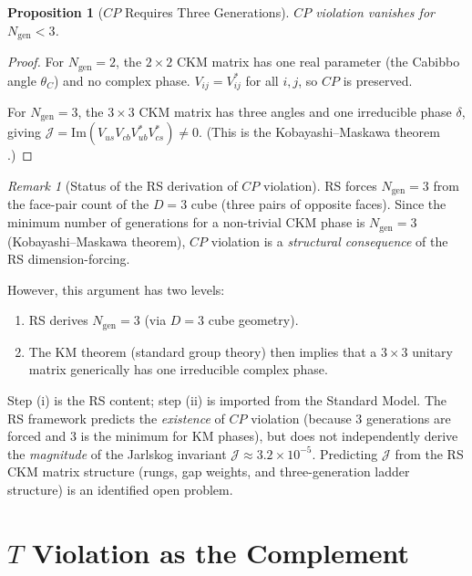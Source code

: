 \documentclass[12pt,a4paper]{article}
\newtheorem{proposition}[theorem]{Proposition}
\theoremstyle{definition}
\theoremstyle{remark}
\newtheorem{remark}[theorem]{Remark}
\begin{document}
\begin{proposition}[$CP$ Requires Three Generations]
\label{prop:three-gen}
$CP$ violation vanishes for $N_{\mathrm{gen}} < 3$.
\end{proposition}

\begin{proof}
For $N_{\mathrm{gen}} = 2$, the $2 \times 2$ CKM matrix has one
real parameter (the Cabibbo angle $\theta_C$) and no complex
phase.  $V_{ij} = V_{ij}^*$ for all $i, j$, so $CP$ is
preserved.

For $N_{\mathrm{gen}} = 3$, the $3 \times 3$ CKM matrix has
three angles and one irreducible phase $\delta$, giving
$\mathcal{J} = \mathrm{Im}(V_{us} V_{cb} V_{ub}^* V_{cs}^*)
\neq 0$.  (This is the Kobayashi--Maskawa theorem \cite{KM1973}.)
\end{proof}

\begin{remark}[Status of the RS derivation of $CP$ violation]
\label{rem:cp-status}
RS forces $N_{\mathrm{gen}} = 3$ from the face-pair count of the
$D = 3$ cube (three pairs of opposite faces).  Since the minimum
number of generations for a non-trivial CKM phase is $N_{\mathrm{gen}}
= 3$ (Kobayashi--Maskawa theorem), $CP$ violation is a \emph{structural
consequence} of the RS dimension-forcing.

However, this argument has two levels:
\begin{enumerate}[label=(\roman*)]
  \item RS derives $N_{\mathrm{gen}} = 3$ (via $D = 3$ cube geometry).
  \item The KM theorem (standard group theory) then implies that a
  $3 \times 3$ unitary matrix generically has one irreducible complex
  phase.
\end{enumerate}
Step (i) is the RS content; step (ii) is imported from the Standard Model.
The RS framework predicts the \emph{existence} of $CP$ violation (because
3 generations are forced and 3 is the minimum for KM phases), but does
not independently derive the \emph{magnitude} of the Jarlskog invariant
$\mathcal{J} \approx 3.2 \times 10^{-5}$.  Predicting $\mathcal{J}$
from the RS CKM matrix structure (rungs, gap weights, and three-generation
ladder structure) is an identified open problem.
\end{remark}

\section{$T$ Violation as the Complement}
\label{sec:t-violation}
\end{document}
